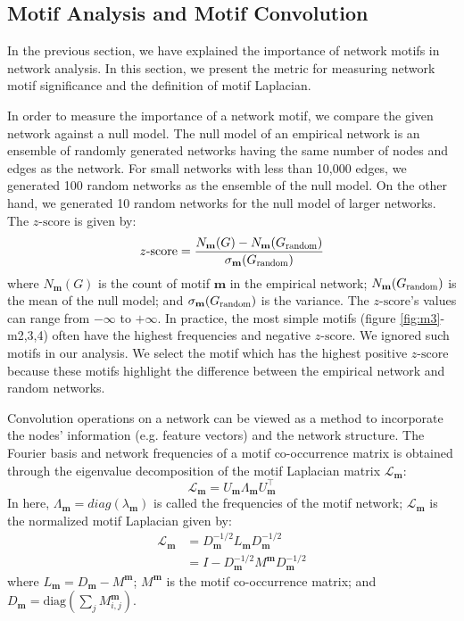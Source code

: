 \documentclass{article}
\theoremstyle{definition}
\begin{document}
\subsection{Motif Analysis and Motif Convolution}

In the previous section, we have explained the importance of
network motifs in network analysis. In this section, we present
the metric for measuring network motif significance and the definition
of motif Laplacian.

In order to measure the importance of a network motif, we compare
the given network against a null model. The null model of an empirical 
network is an ensemble of randomly generated networks having the same 
number of nodes and edges as the network. For small networks with less 
than 10,000 edges, we generated 100 random networks as the ensemble of the 
null model. On the other hand, we generated 10 random networks for the 
null model of larger networks. The $z\mbox{-score}$ is given by:
\begin{equation*}
z\mbox{-score} = \frac{N_\mathbf{m}(G)-N_\mathbf{m}(G_{\scalebox{0.75}{random}})}{\sigma_\mathbf{m}(G_{\scalebox{0.75}{random}})}
\end{equation*}
where $N_\mathbf{m}(G)$ is the count of motif $\mathbf{m}$ in the 
empirical network; $N_\mathbf{m}(G_{\scalebox{0.75}{random}})$ is the mean 
of the null model; and $\sigma_\mathbf{m}(G_{\scalebox{0.75}{random}})$ is
the variance. The $z\mbox{-score}$'s values can range from 
$-\infty$ to $+\infty$. In practice, the most simple motifs (figure 
\ref{fig:m3}-m2,3,4) often have the highest frequencies and negative $z
\mbox{-score}$. We ignored such motifs in our analysis. We select the motif 
which has the highest positive $z\mbox{-score}$ because these motifs
highlight the difference between the empirical network and random 
networks. 

Convolution operations on a network can be viewed as a method to
incorporate the nodes' information (e.g. feature vectors) 
and the network structure. The Fourier basis and network frequencies of
a motif co-occurrence matrix is obtained through the eigenvalue
decomposition of the motif Laplacian matrix $\mathcal{L}_{\mathbf{m}}$:
\begin{equation} \label{eq:eigm}
\mathcal{L}_{\mathbf{m}} = U_{\mathbf{m}} \Lambda_{\mathbf{m}} 
U^{\top}_{\mathbf{m}}
\end{equation}
In here, $\Lambda_{\mathbf{m}} = diag(\lambda_{\mathbf{m}})$ is called the 
frequencies of the motif network; $\mathcal{L}_{\mathbf{m}}$ is the 
normalized motif Laplacian given by:
\begin{equation} 
\begin{aligned}
\mathcal{L}_{\mathbf{m}} &= D_{\mathbf{m}}^{-1/2} L_{\mathbf{m}} 
D_{\mathbf{m}}^{-1/2} \\
&= I - D_{\mathbf{m}}^{-1/2} M^{\mathbf{m}} D_{\mathbf{m}}^{-1/2}
\end{aligned}
\label{eq:eigm}
\end{equation}
where $L_{\mathbf{m}} = D_{\mathbf{m}} - M^{\mathbf{m}}$; $M^{\mathbf{m}}$
is the motif co-occurrence matrix; and $D_{\mathbf{m}} = \mbox{diag} 
( \sum_j M^{\mathbf{m}}_{i,j} )$.
\end{document}
